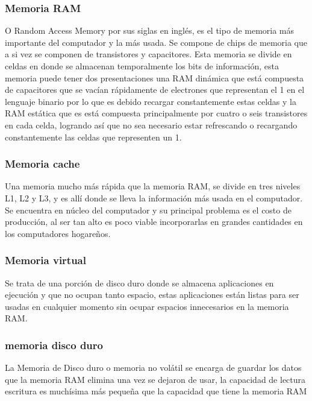 \documentclass{article}
\begin{document}
        \subsubsection{Memoria RAM}
        O Random Access Memory por sus siglas en inglés, es el tipo de memoria más importante del computador y la más usada. Se compone de chips de memoria que a si vez se componen de transistores y capacitores. Esta memoria se divide en celdas en donde se almacenan temporalmente los bits de información, esta memoria puede tener dos presentaciones una RAM dinámica que está compuesta de capacitores que se vacían rápidamente de electrones que representan el 1 en el lenguaje binario por lo que es debido recargar constantemente estas celdas y la RAM estática que es está compuesta principalmente por cuatro o seis transistores en cada celda, logrando así que no sea necesario estar refrescando o recargando constantemente las celdas que representen un 1.
        
        \subsubsection{Memoria cache}
        Una memoria mucho más rápida que la memoria RAM, se divide en tres niveles L1, L2 y L3, y es allí donde se lleva la información más usada en el computador. Se encuentra en núcleo del computador y su principal problema es el costo de producción, al ser tan alto es poco viable incorporarlas en grandes cantidades en los computadores hogareños.   
        
        \subsubsection{Memoria virtual}
        Se trata de una porción de disco duro donde se almacena aplicaciones en ejecución y que no ocupan tanto espacio, estas aplicaciones están listas para ser usadas en cualquier momento sin ocupar espacios innecesarios en la memoria RAM.  
        
        \subsubsection{memoria disco duro}
        La Memoria de Disco duro o memoria no volátil se encarga de guardar los datos que la memoria RAM elimina una vez se dejaron de usar, la capacidad de lectura  escritura es muchísima más pequeña que la capacidad que tiene la memoria RAM
        
        
    
\end{document}
